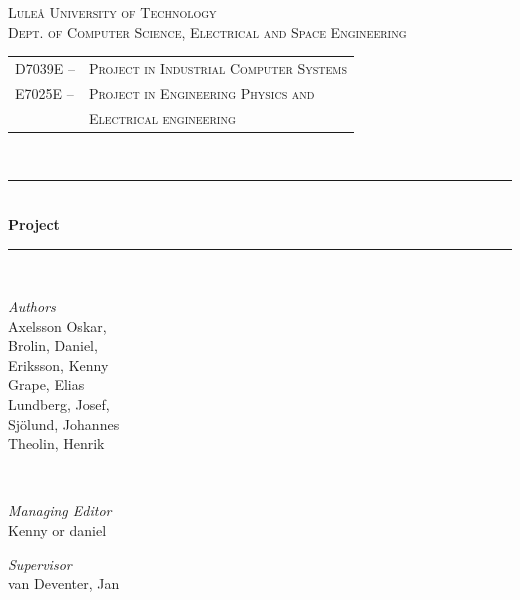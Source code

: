 \newcommand{\HRule}{\rule{\linewidth}{0.5mm}}
\center %


\textsc{\LARGE Luleå University of Technology}\\[1.5cm] %

\textsc{\Large Dept. of Computer Science, Electrical and Space Engineering}\\[0.5cm] %

\begin{centering}
\begin{tabular}{l l}
\textsc{\large D7039E --}	& \textsc{\large Project in Industrial Computer Systems}\\ %
\textsc{\large E7025E --}	& \textsc{\large Project in Engineering Physics and}\\
				& \textsc{\large Electrical engineering} %
\end{tabular}
\end{centering}\\[0.5cm]

\HRule\\[0.8cm]

{\huge\bfseries Project \project}\\[0.4cm] %

\HRule\\[1.5cm]

\begin{minipage}{0.4\textwidth}
	\begin{flushleft}
		\large
		\emph{Authors}\\
		Axelsson Oskar, \\ 
		Brolin, Daniel, \\ 
		Eriksson, Kenny \\ 
		Grape, Elias \\ 
		Lundberg, Josef, \\ 
		Sjölund, Johannes \\
		Theolin, Henrik\\
	\end{flushleft}
\end{minipage}
~
\begin{minipage}{0.4\textwidth}
	\begin{flushright}
		\large
		\textit{Managing Editor}\\
		Kenny or daniel
	\end{flushright}
	\begin{flushright}
		\large
		\textit{Supervisor}\\
		van Deventer, Jan
	\end{flushright}
\end{minipage}

